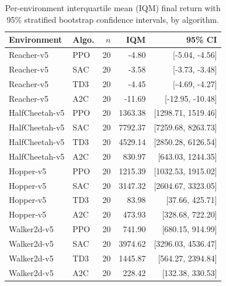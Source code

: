 \begin{table}[t]
\centering
\footnotesize
\caption{Per-environment interquartile mean (IQM) final return with 95\% stratified bootstrap confidence intervals, by algorithm.}
\label{tab:iqm_summary}
\begin{tabular}{llrrr}
\toprule
Environment & Algo. & $n$ & IQM & 95\% CI \\
\midrule
Reacher-v5 & PPO & 20 & -4.80 & [-5.04, -4.56] \\
Reacher-v5 & SAC & 20 & -3.58 & [-3.73, -3.48] \\
Reacher-v5 & TD3 & 20 & -4.45 & [-4.69, -4.27] \\
Reacher-v5 & A2C & 20 & -11.69 & [-12.95, -10.48] \\
HalfCheetah-v5 & PPO & 20 & 1363.38 & [1298.71, 1519.46] \\
HalfCheetah-v5 & SAC & 20 & 7792.37 & [7259.68, 8263.73] \\
HalfCheetah-v5 & TD3 & 20 & 4529.14 & [2850.28, 6126.54] \\
HalfCheetah-v5 & A2C & 20 & 830.97 & [643.03, 1244.35] \\
Hopper-v5 & PPO & 20 & 1215.39 & [1032.53, 1915.02] \\
Hopper-v5 & SAC & 20 & 3147.32 & [2604.67, 3323.05] \\
Hopper-v5 & TD3 & 20 & 83.98 & [37.66, 425.71] \\
Hopper-v5 & A2C & 20 & 473.93 & [328.68, 722.20] \\
Walker2d-v5 & PPO & 20 & 741.90 & [680.15, 914.99] \\
Walker2d-v5 & SAC & 20 & 3974.62 & [3296.03, 4536.47] \\
Walker2d-v5 & TD3 & 20 & 1445.87 & [564.27, 2394.84] \\
Walker2d-v5 & A2C & 20 & 228.42 & [132.38, 330.53] \\
\bottomrule
\end{tabular}
\end{table}